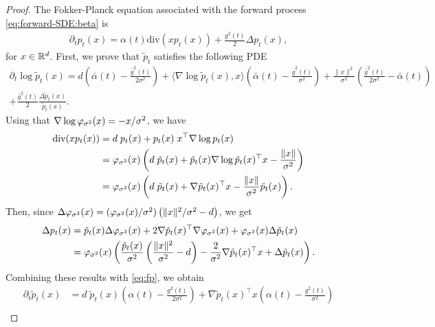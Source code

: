 \documentclass[english,graybox,envcountchap,envcountsame,sectrefs,shortlabels]{svmono}
\theoremstyle{style}
\newcommand{\eqsp}{}
\begin{document}
\begin{proof}
The Fokker-Planck equation associated with the forward process \eqref{eq:forward-SDE:beta} is
\begin{align}
\label{eq:fp}
    \partial_{t} p_{t}(x) = \alpha (t) \text{div} \left( x p_{t} (x) \right) + \frac{g^2 (t)}{2} \Delta p_{t} (x)\eqsp,
\end{align}
for $x \in \mathbb{R}^d$. First, we prove that $\tilde p_t$ satisfies the following PDE
\begin{equation}\label{eq:PDE_log_p_t}
    \begin{split}
        \partial_{t} \log \tilde p_{t}(x)  = d \left(  \bar \alpha(t) - \frac{\bar g^2(t)}{2 \sigma^2} \right) + \langle \nabla \log \tilde p_{t}(x),x \rangle  \left( \bar \alpha(t) - \frac{ \bar g^2(t)}{\sigma^2 } \right)  + \frac{\|x\|^2}{\sigma^2}  \left( \frac{\bar g^2(t)}{2 \sigma^2} - \bar \alpha(t) \right) \\+ \frac{\bar g^2(t)}{2} \frac{\Delta \tilde p_{t}(x)}{\tilde p_{t}(x)}\eqsp.
    \end{split}
\end{equation}
Using that $\nabla \log \varphi_{\sigma^2}(x) = -x/\sigma^2$, we have
\begin{align*}
 \text{div} ( x p_{t} (x) )
 &=d \;p_{t}(x) + p_{t} (x)  \;x^\top \nabla \log p_{t} (x) \\
 &= \gausspdf_{\sigma^2}(x)\left(d \;\tilde p_{t}(x)  + \tilde p_{t}(x)  \nabla \log \tilde p_{t}(x)^\top x - \frac{\|x\|}{\sigma^2} \right)\\
 &= \gausspdf_{\sigma^2}(x)\left(d \;\tilde p_{t}(x)  + \nabla \tilde p_{t}(x)^\top x - \frac{\|x\|}{\sigma^2} \tilde p_{t}(x)\right)\eqsp.
\end{align*}
Then, since $\Delta \varphi_{\sigma^2}(x) =(\varphi_{\sigma^2}(x)/\sigma^2) \left(\|x\|^2/\sigma^2 -d \right)$, we get
\begin{align*}
    \Delta p_{t}(x) &= \tilde p_{t}(x) \Delta \gausspdf_{\sigma^2}(x) + 2  \nabla \tilde p_{t}(x)^\top \nabla \gausspdf_{\sigma^2}(x) + \gausspdf_{\sigma^2}(x) \Delta \tilde p_{t}(x)
    \\
    &=\gausspdf_{\sigma^2}(x) \left(
    \frac{\tilde p_{t}(x)}{\sigma^2} \left( \frac{\|x\|^2}{\sigma^2} - d \right) - \frac{2}{\sigma^2}\nabla \tilde p_{t}(x)^\top x + \Delta \tilde p_{t}(x) \right)
    \eqsp.
\end{align*}
Combining these results with \eqref{eq:fp}, we obtain
\begin{align*}
     \partial_{t} \tilde p_{t}(x)&= d\; \tilde p_{t}(x) \left(  \alpha(t) - \frac{g^2(t)}{2 \sigma^2} \right) + \nabla \tilde p_{t}(x)^\top x \left( \alpha(t) - \frac{ g^2(t)}{\sigma^2 } \right)  \\

\end{align*}
\end{proof}
\end{document}
